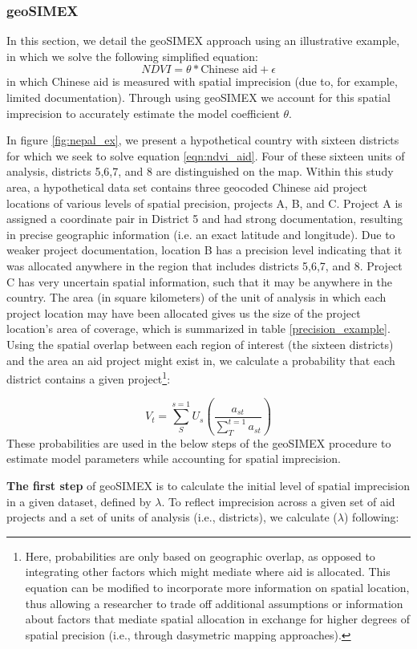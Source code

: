 \subsubsection{geoSIMEX}
In this section, we detail the geoSIMEX approach using an illustrative example, in which we solve the following simplified equation:
\begin{equation}
NDVI = \theta * \text{Chinese aid} + \epsilon
\label{eqn:ndvi_aid}
\end{equation}
in which Chinese aid is measured with spatial imprecision (due to, for example, limited documentation). 
Through using geoSIMEX we account for this spatial imprecision to accurately estimate the model coefficient $\theta$. 
\par
In figure \ref{fig:nepal_ex}, we present a hypothetical country with sixteen districts for which we seek to solve equation \ref{eqn:ndvi_aid}. 
Four of these sixteen units of analysis, districts 5,6,7, and 8 are distinguished on the map. 
Within this study area, a hypothetical data set contains three geocoded Chinese aid project locations of various levels of spatial precision, projects A, B, and C. 
Project A is assigned a coordinate pair in District 5 and had strong documentation, resulting
in precise geographic information (i.e. an exact latitude and longitude). 
Due to weaker project documentation, location B has a precision level indicating that it was allocated anywhere in the region that includes districts 5,6,7, and 8. 
Project C has very uncertain spatial information, such that it may be anywhere in the country. 
The area (in square kilometers) of the unit of analysis in which each project location may have been allocated gives us the size of the project location’s area of coverage, which is summarized in table \ref{precision_example}.
Using the spatial overlap between each region of interest (the sixteen districts) and the area an aid project might exist in, we calculate a probability that each district contains a given project\footnote{Here, probabilities are only based on geographic overlap, as opposed to integrating other factors which might mediate where aid is allocated. This equation can be modified to incorporate more information on spatial location, thus allowing a researcher to trade off additional assumptions or information about factors that mediate spatial allocation in exchange for higher degrees of spatial precision (i.e., through dasymetric mapping approaches).}:

\begin{equation}\label{eq:overlaps}
V_{t} = \sum_{S}^{s=1}U_{s}\left ( \frac{a_{st}}{\sum_{T}^{t=1}a_{st}} \right )
\end{equation}
\noindent 
These probabilities are used in the below steps of the geoSIMEX procedure to estimate model parameters while accounting for spatial imprecision.
\par
\textbf{The first step} of geoSIMEX is to calculate the initial level of spatial imprecision in a given dataset, defined by $\lambda$.
To reflect imprecision across a given set of aid projects and a set of units of analysis (i.e., districts), we calculate (\begin{math}\lambda\end{math}) following:

